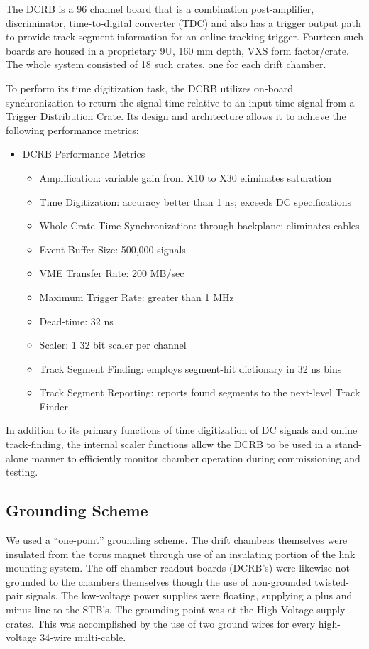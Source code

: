 The DCRB is a 96 channel board that is a combination post-amplifier,
discriminator, time-to-digital converter (TDC) and also has a trigger
output path to provide track segment information for an online tracking trigger.
Fourteen such boards are housed in
a proprietary 9U, 160 mm depth, VXS form factor/crate.
The whole system consisted of 18 such crates, one for each drift chamber.

To perform its time digitization task, the DCRB utilizes on-board synchronization to
return the signal time relative to an input time signal from  a Trigger Distribution
Crate.
Its design and architecture
allows it to achieve the following performance metrics:
\begin{itemize}
\item DCRB Performance Metrics
\begin{itemize}
\item Amplification: variable gain from X10 to X30 eliminates saturation
\item Time Digitization: accuracy better than 1 ns; exceeds DC specifications
\item Whole Crate Time Synchronization: through backplane; eliminates cables
\item Event Buffer Size: 500,000 signals
\item VME Transfer Rate: 200 MB/sec
\item Maximum Trigger Rate: greater than 1 MHz
\item Dead-time: 32 ns
\item Scaler: 1 32 bit scaler per channel
\item Track Segment Finding: employs segment-hit dictionary in 32 ns bins
\item Track Segment Reporting: reports found segments to the next-level Track Finder
\end{itemize}
\end{itemize}

In addition to its primary functions of time digitization of DC signals and online
track-finding, the internal scaler functions allow the DCRB to be used in 
a stand-alone manner to efficiently monitor chamber operation during commissioning
and testing.

\subsection{Grounding Scheme}
We used a ``one-point'' grounding scheme.  The drift chambers themselves were insulated
from the torus magnet through use of an insulating portion of the link
mounting system.  The off-chamber readout boards (DCRB's) were likewise not grounded
to the chambers themselves though the use of non-grounded twisted-pair signals.
The low-voltage power supplies were floating, supplying a plus and minus line 
to the STB's.
The grounding point was at the High Voltage supply crates.  This was accomplished
by the use of two ground wires for every high-voltage 34-wire multi-cable.
